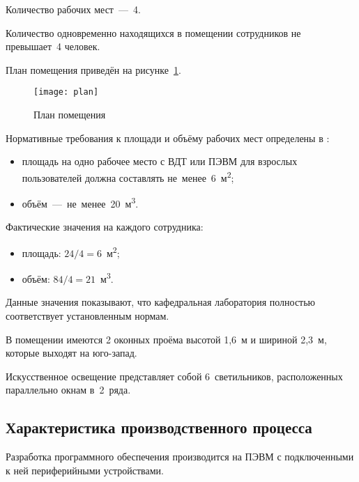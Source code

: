 Количество рабочих мест~---~4.

Количество одновременно находящихся в помещении сотрудников не превышает~4 человек.

План помещения приведён на рисунке~\ref{fig:labourprotection:room_plan}.
\begin{figure}[h]
\texttt{[image: plan]}
\caption{План помещения}\label{fig:labourprotection:room_plan}
\end{figure}

Нормативные требования к площади и объёму рабочих мест определены в \cite{SanPin2_2_2}:
\begin{itemize}
	\item площадь на одно рабочее место с ВДТ или ПЭВМ для взрослых пользователей должна составлять не~менее~6~м\textsuperscript{2};
	\item объём~---~не~менее~20~м\textsuperscript{3}.
\end{itemize}

Фактические значения на каждого сотрудника:
\begin{itemize}
	\item площадь: $24/4 = 6$~м\textsuperscript{2};
	\item объём: $84/4 = 21$~м\textsuperscript{3}.
\end{itemize}

Данные значения показывают, что кафедральная лаборатория полностью соответствует установленным нормам.

В помещении имеются 2 оконных проёма высотой 1,6~м и шириной 2,3~м, которые выходят на юго-запад.

Искусственное освещение представляет собой 6~светильников, расположенных параллельно окнам в~2~ряда.

\subsection{Характеристика производственного процесса}
Разработка программного обеспечения производится на ПЭВМ с подключенными к ней периферийными устройствами.

